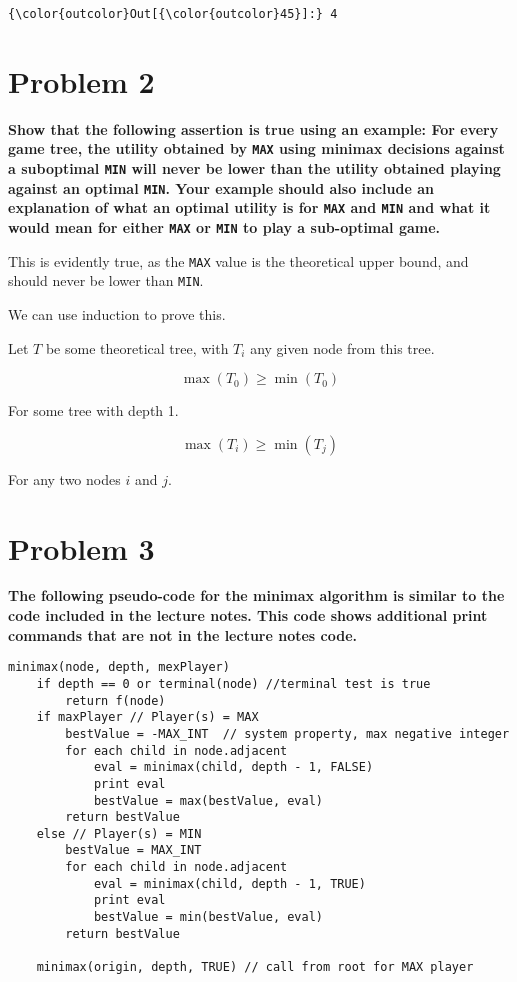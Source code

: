 \documentclass[11pt]{article}
\begin{document}
            \begin{Verbatim}[commandchars=\\\{\}]
{\color{outcolor}Out[{\color{outcolor}45}]:} 4
\end{Verbatim}
        
    \section{Problem 2}\label{problem-2}

\textbf{Show that the following assertion is true using an example: For
every game tree, the utility obtained by \texttt{MAX} using minimax
decisions against a suboptimal \texttt{MIN} will never be lower than the
utility obtained playing against an optimal \texttt{MIN}. Your example
should also include an explanation of what an optimal utility is for
\texttt{MAX} and \texttt{MIN} and what it would mean for either
\texttt{MAX} or \texttt{MIN} to play a sub-optimal game.}

    This is evidently true, as the \texttt{MAX} value is the theoretical
upper bound, and should never be lower than \texttt{MIN}.

We can use induction to prove this.

Let \(T\) be some theoretical tree, with \(T_i\) any given node from
this tree.

\[
\max(T_0) \ge \min(T_0)
\]

For some tree with depth 1.

\[
\max(T_i) \ge \min(T_{j})
\]

For any two nodes \(i\) and \(j\).

    \section{Problem 3}\label{problem-3}

\textbf{The following pseudo-code for the minimax algorithm is similar
to the code included in the lecture notes. This code shows additional
print commands that are not in the lecture notes code.}

\begin{verbatim}
minimax(node, depth, mexPlayer)
    if depth == 0 or terminal(node) //terminal test is true
        return f(node)
    if maxPlayer // Player(s) = MAX
        bestValue = -MAX_INT  // system property, max negative integer
        for each child in node.adjacent
            eval = minimax(child, depth - 1, FALSE)
            print eval
            bestValue = max(bestValue, eval)
        return bestValue
    else // Player(s) = MIN
        bestValue = MAX_INT
        for each child in node.adjacent
            eval = minimax(child, depth - 1, TRUE)
            print eval
            bestValue = min(bestValue, eval)
        return bestValue
    
    minimax(origin, depth, TRUE) // call from root for MAX player
\end{verbatim}
\end{document}
